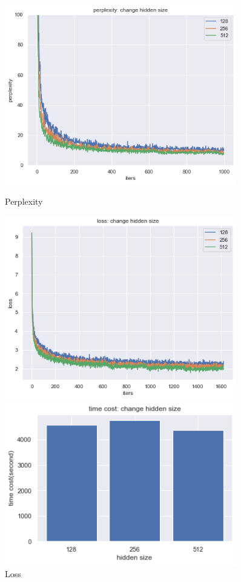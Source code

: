 \begin{figure}[H]
    \centering 
    \begin{minipage}[b]{0.3\textwidth} 
    \centering 
    \includegraphics[width=0.9\textwidth]{p_hiddensize.png}
    \caption{Perplexity} 
    \label{Fig.1}
    \end{minipage}
    \begin{minipage}[b]{0.3\textwidth}
    \centering 
    \includegraphics[width=0.9\textwidth]{l_hiddensize.png}
    \caption{Loss}
    \label{Fig.2}
    \end{minipage}
    \begin{minipage}[b]{0.3\textwidth}
    \centering 
    \includegraphics[width=0.9\textwidth]{time_hiddensize.png}

\end{minipage}
\end{figure}

